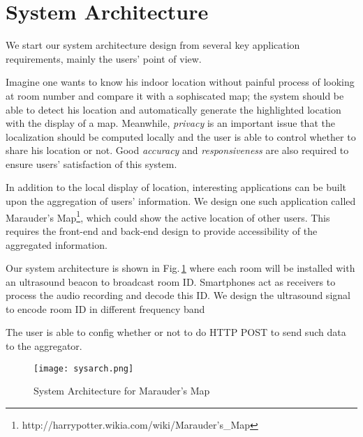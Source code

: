 \section{System Architecture}
\label{sec:system-architecture}
We start our system architecture design from several key application requirements, mainly the users' point of view.

Imagine one wants to know his indoor location without painful process of looking at room number and compare it with a sophiscated map; the system should be able to detect his location and automatically generate the highlighted location with the display of a map. Meanwhile, {\em privacy} is an important issue that the localization should be computed locally and the user is able to control whether to share his location or not. Good {\em accuracy} and {\em responsiveness} are also required to ensure users' satisfaction of this system. 

In addition to the local display of location, interesting applications can be built upon the aggregation of users' information. We design one such application called Marauder's Map\footnote{http://harrypotter.wikia.com/wiki/Marauder's\_Map}, which could show the active location of other users. This requires the front-end and back-end design to provide accessibility of the aggregated information.

Our system architecture is shown in Fig.\,\ref{fig:sysarch} where each room will be installed with an ultrasound beacon to broadcast room ID. Smartphones act as receivers to process the audio recording and decode this ID. We design the ultrasound signal to encode room ID in different frequency band

 The user is able to config whether or not to do HTTP POST to send such data to the aggregator. 


\begin{figure}
  \centering
  \texttt{[image: sysarch.png]}
  \caption{System Architecture for Marauder's Map}
  \label{fig:sysarch}
\end{figure}

